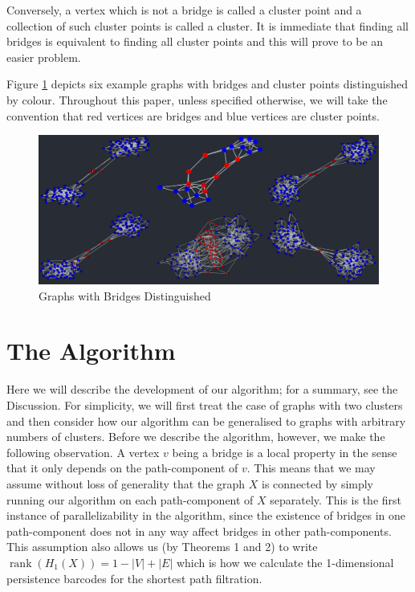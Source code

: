 \documentclass[12pt,a4paper]{amsart}
\numberwithin{equation}{section}
\def\rank{\operatorname{rank}}
\theoremstyle{plain}
\theoremstyle{definition}
\begin{document}
Conversely, a vertex which is not a bridge is called a cluster point and a collection of such cluster points is called a cluster. It is immediate that finding all bridges is equivalent to finding all cluster points and this will prove to be an easier problem.

Figure \ref{bridges} depicts six example graphs with bridges and cluster points distinguished by colour. Throughout this paper, unless specified otherwise, we will take the convention that red vertices are bridges and blue vertices are cluster points.

\begin{figure}[h]
	\centering
	\includegraphics[scale=0.5]{BridgesDistinguished.jpg}
	\caption{Graphs with Bridges Distinguished}
	\label{bridges}
\end{figure}

\newpage

\section*{The Algorithm}

Here we will describe the development of our algorithm; for a summary, see the Discussion. For simplicity, we will first treat the case of graphs with two clusters and then consider how our algorithm can be generalised to graphs with arbitrary numbers of clusters. Before we describe the algorithm, however, we make the following observation. A vertex $v$ being a bridge is a local property in the sense that it only depends on the path-component of $v$. This means that we may assume without loss of generality that the graph $X$ is connected by simply running our algorithm on each path-component of $X$ separately. This is the first instance of parallelizability in the algorithm, since the existence of bridges in one path-component does not in any way affect bridges in other path-components. This assumption also allows us (by Theorems 1 and 2) to write $\rank(H_1(X)) = 1 - |V| + |E|$ which is how we calculate the 1-dimensional persistence barcodes for the shortest path filtration.
\end{document}
